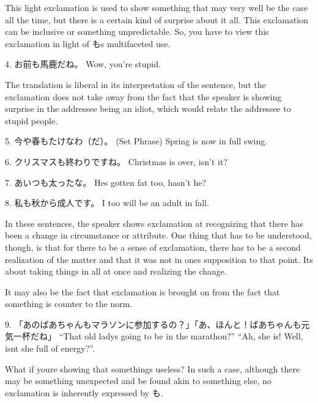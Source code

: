 \par{ This light exclamation is used to show something that may very well be the case all the time, but there is a certain kind of surprise about it all. This exclamation can be inclusive or something unpredictable. So, you have to view this exclamation in light of も\textquotesingle s multifaceted use. }

\par{4. お前も馬鹿だね。 \hfill\break
Wow, you're stupid. }

\par{ The translation is liberal in its interpretation of the sentence, but the exclamation does not take away from the fact that the speaker is showing surprise in the addressee being an idiot, which would relate the addressee to stupid people. }

\par{5. 今や春もたけなわ（だ）。 (Set Phrase) \hfill\break
Spring is now in full swing. }

\par{6. クリスマスも終わりですね。 \hfill\break
Christmas is over, isn't it? }

\par{7. あいつも太ったな。 \hfill\break
He\textquotesingle s gotten fat too, hasn't he? }

\par{8. 私も秋から成人です。 \hfill\break
I too will be an adult in fall. }

\par{ In these sentences, the speaker shows exclamation at recognizing that there has been a change in circumstance or attribute. One thing that has to be understood, though, is that for there to be a sense of exclamation, there has to be a second realization of the matter and that it was not in one\textquotesingle s supposition to that point. It\textquotesingle s about taking things in all at once and realizing the change. }

\par{ It may also be the fact that exclamation is brought on from the fact that something is counter to the norm. }

\par{9. 「あのばあちゃんもマラソンに参加するの？」「あ、ほんと！ばあちゃんも元気一杯だね」 \hfill\break
“That old lady\textquotesingle s going to be in the marathon?” “Ah, she is! Well, isn\textquotesingle t she full of energy?”. }

\par{ What if you\textquotesingle re showing that something\textquotesingle s useless? In such a case, although there may be something unexpected and be found akin to something else, no exclamation is inherently expressed by も. }

